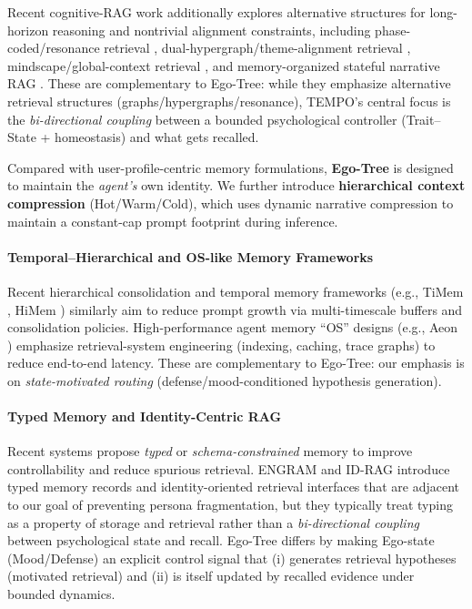 \documentclass[11pt]{article}
\begin{document}
Recent cognitive-RAG work additionally explores alternative structures for long-horizon reasoning and nontrivial alignment constraints, including phase-coded/resonance retrieval \cite{saklakov2025phasecoded}, dual-hypergraph/theme-alignment retrieval \cite{hu2025cograg}, mindscape/global-context retrieval \cite{salama2025meminsight}, and memory-organized stateful narrative RAG \cite{wang2025comorag}. These are complementary to Ego-Tree: while they emphasize alternative retrieval structures (graphs/hypergraphs/resonance), TEMPO's central focus is the \emph{bi-directional coupling} between a bounded psychological controller (Trait--State + homeostasis) and what gets recalled.

Compared with user-profile-centric memory formulations, \textbf{Ego-Tree} is designed to maintain the \textit{agent's} own identity. We further introduce \textbf{hierarchical context compression} (Hot/Warm/Cold), which uses dynamic narrative compression to maintain a constant-cap prompt footprint during inference.

\paragraph{Temporal--Hierarchical and OS-like Memory Frameworks}
Recent hierarchical consolidation and temporal memory frameworks (e.g., TiMem \cite{timem2025}, HiMem \cite{himem2025}) similarly aim to reduce prompt growth via multi-timescale buffers and consolidation policies. High-performance agent memory ``OS'' designs (e.g., Aeon \cite{aeon2025}) emphasize retrieval-system engineering (indexing, caching, trace graphs) to reduce end-to-end latency. These are complementary to Ego-Tree: our emphasis is on \emph{state-motivated routing} (defense/mood-conditioned hypothesis generation).

\paragraph{Typed Memory and Identity-Centric RAG}
Recent systems propose \emph{typed} or \emph{schema-constrained} memory to improve controllability and reduce spurious retrieval. ENGRAM and ID-RAG introduce typed memory records and identity-oriented retrieval interfaces that are adjacent to our goal of preventing persona fragmentation, but they typically treat typing as a property of storage and retrieval rather than a \emph{bi-directional coupling} between psychological state and recall. Ego-Tree differs by making Ego-state (Mood/Defense) an explicit control signal that (i) generates retrieval hypotheses (motivated retrieval) and (ii) is itself updated by recalled evidence under bounded dynamics.
\end{document}
